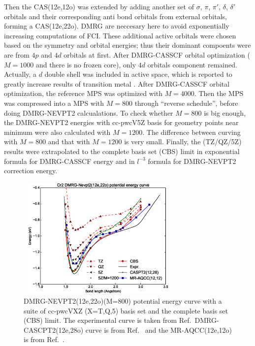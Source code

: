 Then the CAS(12e,12o) was extended by adding another set of $\sigma$, $\pi$, $\pi'$, $\delta$, $\delta'$ orbitals and their corresponding anti bond orbitals from external orbitals, forming a CAS(12e,22o). 
DMRG are neccesary here to avoid exponentially increasing computations of FCI.
These additional active orbitals were chosen based on the symmetry and orbital energies; thus their dominant compoents were are from $4p$ and $4d$ orbitals at first. After DMRG-CASSCF orbital optimization ($M=1000$ and there is no frozen core), only $4d$ orbitals component remained. Actually, a $d$ double shell was included in active space, which is reported to greatly increase results of transition metal \cite{andersson_excitation_1992}.
After DMRG-CASSCF orbital optimization, the reference MPS was optimized with $M=4000$. Then the MPS was compressed into a MPS with $M=800$ through ``reverse schedule'', before doing DMRG-NEVPT2 calcualations. To check whether $M=800$ is big enough, the DMRG-NEVPT2 energies with cc-pwcV5Z basis for geometry points near minimum were also calculated with $M=1200$. The difference between curving with $M=800$ and that with $M=1200$ is very small. Finally, the (TZ/QZ/5Z) results were extrapolated to the complete basis set (CBS) limit in exponential formula for DMRG-CASSCF energy and in $l^{-3}$ formula for DMRG-NEVPT2 correction energy.


\begin{figure}
  \includegraphics[width=8cm,height=6cm]{application/5qt-fitting.eps}
  \caption{DMRG-NEVPT2(12e,22o)(M=800) potential energy curve with a suite of cc-pwcVXZ (X=T,Q,5) basis set and the complete basis set (CBS) limit. The experimental curve is taken from Ref.~DMRG-CASCPT2(12e,28o) curve is from Ref.~ and the MR-AQCC(12e,12o) is from Ref.~.}
  \label{fig:5qt_fitting}
\end{figure}

